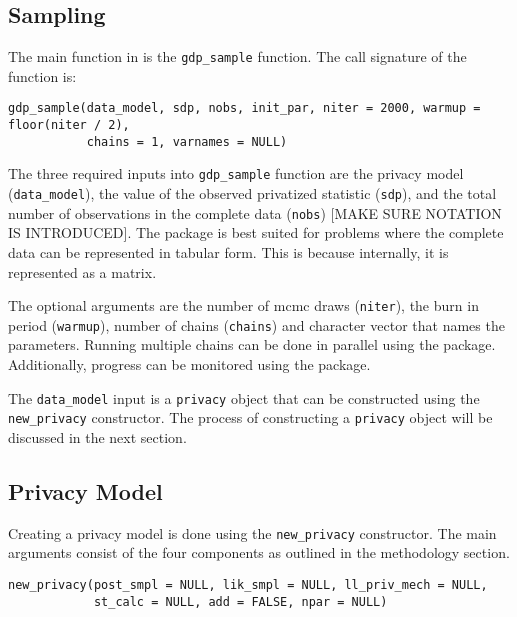 \hypertarget{sampling}{%
\subsection{Sampling}\label{sampling}}

The main function in  is the \texttt{gdp\_sample} function. The call
signature of the function is:

\begin{verbatim}
gdp_sample(data_model, sdp, nobs, init_par, niter = 2000, warmup = floor(niter / 2),
           chains = 1, varnames = NULL)
\end{verbatim}

The three required inputs into \texttt{gdp\_sample} function are the privacy model (\texttt{data\_model}), the value
of the observed privatized statistic (\texttt{sdp}), and the total number of observations
in the complete data (\texttt{nobs}) {[}MAKE SURE NOTATION IS INTRODUCED{]}. The 
package is best suited for problems where the complete data can be represented in
tabular form. This is because internally, it is represented as a matrix.

The optional arguments are the number of mcmc draws (\texttt{niter}), the
burn in period (\texttt{warmup}), number of chains (\texttt{chains}) and character
vector that names the parameters. Running multiple chains can be done in parallel
using the  package. Additionally, progress can be monitored
using the  package.

The \texttt{data\_model} input is a \texttt{privacy}
object that can be constructed using the \texttt{new\_privacy} constructor. The
process of constructing a \texttt{privacy} object will be discussed in the next section.

\hypertarget{privacy-model}{%
\subsection{Privacy Model}\label{privacy-model}}

Creating a privacy model is done using the \texttt{new\_privacy} constructor. The
main arguments consist of the four components as outlined in the methodology
section.

\begin{verbatim}
new_privacy(post_smpl = NULL, lik_smpl = NULL, ll_priv_mech = NULL,
            st_calc = NULL, add = FALSE, npar = NULL)
\end{verbatim}

